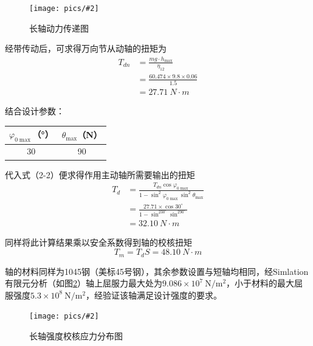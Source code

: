 \documentclass[UTF8]{article}%
\renewcommand{\arraystretch}{1.5}
\newcommand{\p}[4][0.5]{\begin{figure}[h]\centering\texttt{[image: pics/\#2]}\\\caption{#3}\label{#4}\end{figure}}%
\newcommand{\n}{\par}%
\begin{document}
\begin{spacing}{1.5}
		\p[0.35]{长轴动力传递图.png}{长轴动力传递图}{czdlcdt}\n
		经带传动后，可求得万向节从动轴的扭矩为
		\begin{align*}
			T_{dn}&=\frac{mg\cdot h_{\max}}{\eta_{12}}\\
			&=\frac{60.474\times9.8\times0.06}{1.5}\\
			&=\SI{27.71}{N\cdot m}
		\end{align*}\n
		结合设计参数：
		\begin{center}
			\renewcommand{\arraystretch}{1}
			\begin{tabular}{|c|c|}
				\hline$\varphi_{0\max}$（°）&$\theta_{\max}$（N）\\
				\hline30&90\\\hline
			\end{tabular}
		\end{center}\n
		代入式（2-2）便求得作用主动轴所需要输出的扭矩
		\begin{align*}
			T_d&=\frac{T_{dn}\cos\varphi_{0\max}}{1-\sin^2\varphi_{0\max}\sin^2\theta_{\max}}\\
			&=\frac{27.71\times\cos30^{\circ}}{1-\sin^230^{\circ}\sin^290^{\circ}}\\
			&=\SI{32.10}{N\cdot m}
		\end{align*}\n
		同样将此计算结果乘以安全系数得到轴的校核扭矩$$T_m=T_dS=\SI{48.10}{N\cdot m}$$\n
		轴的材料同样为1045钢（美标45号钢），其余参数设置与短轴均相同，经Simlation有限元分析（如图\ref{czjh}）轴上屈服力最大处为$9.086\times10^7~\mathrm{N/m^2}$，小于材料的最大屈服强度$5.3\times10^8~\mathrm{N/m^2}$，经验证该轴满足设计强度的要求。
		\p[0.4]{长轴强度校核应力分布图.png}{长轴强度校核应力分布图}{czjh}

\end{spacing}
\end{document}
